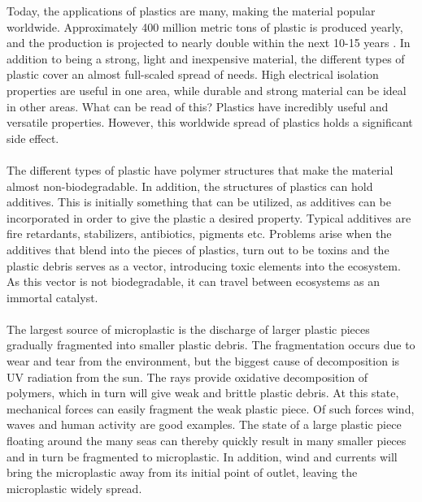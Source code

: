 Today, the applications of plastics are many, making the material popular worldwide. %
Approximately 400 million metric tons of plastic is produced yearly, and the production is projected to nearly double within the next 10-15 years \cite{worldenvironmentday_2018}. In addition to being a strong, light and inexpensive material, the different types of plastic cover an almost full-scaled spread of needs. High electrical isolation properties are useful in one area, while durable and strong material can be ideal in other areas. What can be read of this? Plastics have incredibly useful and versatile properties. However, this worldwide spread of plastics holds a significant side effect. 
\\\\
The different types of plastic have polymer structures that make the material almost non-biodegradable. In addition, the structures of plastics can hold additives. This is initially something that can be utilized, as additives can be incorporated in order to give the plastic a desired property. Typical additives are fire retardants, stabilizers, antibiotics, pigments etc. \cite{qualman_2017} Problems arise when the additives that blend into the pieces of plastics, turn out to be toxins and the plastic debris serves as a vector, introducing toxic elements into the ecosystem. As this vector is not biodegradable, it can travel between ecosystems as an immortal catalyst.
\\\\
The largest source of microplastic is the discharge of larger plastic pieces gradually fragmented into smaller plastic debris. The fragmentation occurs due to wear and tear from the environment, but the biggest cause of decomposition is UV radiation from the sun. The rays provide oxidative decomposition of polymers, which in turn will give weak and brittle plastic debris. At this state, mechanical forces can easily fragment the weak plastic piece. Of such forces wind, waves and human activity are good examples. The state of a large plastic piece floating around the many seas can thereby quickly result in many smaller pieces and in turn be fragmented to microplastic. In addition, wind and currents will bring the microplastic away from its initial point of outlet, leaving the microplastic widely spread.
\\\\
